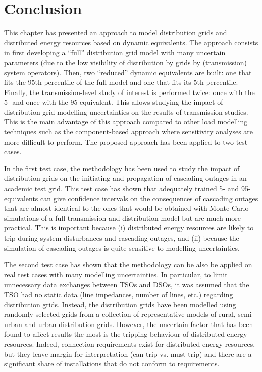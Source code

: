 \section{Conclusion}
\label{sec:distrib_conclusion}

This chapter has presented an approach to model distribution grids and distributed energy resources based on dynamic equivalents. The approach consists in first developing a ``full'' distribution grid model with many uncertain parameters (due to the low visibility of distribution by grids by (transmission) system operators). Then, two ``reduced'' dynamic equivalents are built: one that fits the 95th percentile of the full model and one that fits its 5th percentile. Finally, the transmission-level study of interest is performed twice: once with the 5- and once with the 95-equivalent. This allows studying the impact of distribution grid modelling uncertainties on the results of transmission studies. This is the main advantage of this approach compared to other load modelling techniques such as the component-based approach where sensitivity analyses are more difficult to perform. The proposed approach has been applied to two test cases.

In the first test case, the methodology has been used to study the impact of distribution grids on the initiating and propagation of cascading outages in an academic test grid. This test case has shown that adequately trained 5- and 95-equivalents can give confidence intervals on the consequences of cascading outages that are almost identical to the ones that would be obtained with Monte Carlo simulations of a full transmission and distribution model but are much more practical. This is important because (i) distributed energy resources are likely to trip during system disturbances and cascading outages, and (ii) because the simulation of cascading outages is quite sensitive to modelling uncertainties.

The second test case has shown that the methodology can be also be applied on real test cases with many modelling uncertainties. In particular, to limit unnecessary data exchanges between TSOs and DSOs, it was assumed that the TSO had no static data (line impedances, number of lines, etc.) regarding distribution grids. Instead, the distribution grids have been modelled using randomly selected grids from a collection of representative models of rural, semi-urban and urban distribution grids. However, the uncertain factor that has been found to affect results the most is the tripping behaviour of distributed energy resources. Indeed, connection requirements exist for distributed energy resources, but they leave margin for interpretation (can trip vs. must trip) and there are a significant share of installations that do not conform to requirements.

